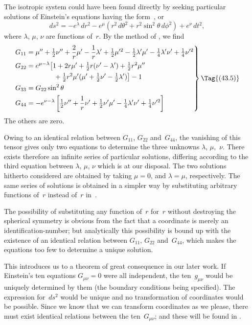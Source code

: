 \documentclass[12pt]{book}
\begin{document}
The isotropic system could have been found directly by seeking particular
solutions of Einstein's equations having the form~, or
\[
ds^{2} = -e^{\lambda}\, dr^{2} - e^{\mu}(r^{2}\, d\theta^{2} + r^{2}\sin^{2}\theta\, d\phi^{2}) + e^{\nu}\, dt^{2},
\]
where $\lambda$, $\mu$, $\nu$ are functions of~$r$. By the method of , we find
\[
\left.
\begin{aligned}
G_{11} &= \mu'' + \tfrac{1}{2}\nu'' + \frac{2}{r}\mu' - \frac{1}{r}\lambda' + \tfrac{1}{2}\mu'^{2} - \tfrac{1}{2}\lambda'\mu' - \tfrac{1}{4}\lambda'\nu' + \tfrac{1}{4}\nu'^{2}\\
G_{22} &= e^{\mu-\lambda} \bigl[1 + 2r\mu' + \tfrac{1}{2}r(\nu' - \lambda') + \tfrac{1}{2}r^{2}\mu''\\
  &\qquad\qquad+ \tfrac{1}{2}r^{2}\mu'(\mu' + \tfrac{1}{2}\nu' - \tfrac{1}{2}\lambda')\bigr] - 1\\
G_{33} &= G_{22} \sin^{2}\theta\\
G_{44} &= -e^{\nu-\lambda}\left[\tfrac{1}{2}\nu'' + \frac{1}{r}\nu' + \tfrac{1}{2}\nu'\mu' - \tfrac{1}{4}\lambda'\nu' + \tfrac{1}{4}\nu'^{2}\right]
\end{aligned}
\right\}
\Tag{(43.5)}
\]
The others are zero.

Owing to an identical relation between $G_{11}$, $G_{22}$ and~$G_{44}$, the vanishing of
this tensor gives only two equations to determine the three unknowns $\lambda$, $\mu$,~$\nu$.
There exists therefore an infinite series of particular solutions, differing
according to the third equation between $\lambda$, $\mu$, $\nu$ which is at our disposal. The
two solutions hitherto considered are obtained by taking $\mu = 0$, and $\lambda = \mu$,
respectively. The same series of solutions is obtained in a simpler way by
substituting arbitrary functions of~$r$ instead of~$r$ in~.

The possibility of substituting any function of~$r$ for~$r$ without destroying
the spherical symmetry is obvious from the fact that a coordinate is merely
an identification-number; but analytically this possibility is bound up with
the existence of an identical relation between $G_{11}$, $G_{22}$ and~$G_{44}$, which makes
the equations too few to determine a unique solution.

This introduces us to a theorem of great consequence in our later work.
%
If Einstein's ten equations $G_{\mu\nu} = 0$ were all independent, the ten~$g_{\mu\nu}$ would be
uniquely determined by them (the boundary conditions being specified). The
expression for~$ds^{2}$ would be unique and no transformation of coordinates would
be possible. Since we know that we can transform coordinates as we please,
there must exist identical relations between the ten~$G_{\mu\nu}$; and these will be
found in .
\end{document}
